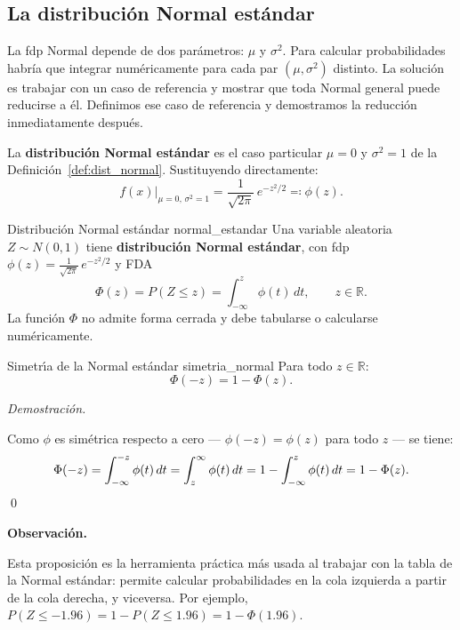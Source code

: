 \documentclass[12pt, a4paper]{book}
\newenvironment{observacion}{%
    \par\medskip\noindent\textbf{\color{azul}Observaci\'{o}n.}\enspace\itshape
}{\par\medskip}
\renewenvironment{proof}{%
    \par\medskip\noindent\textit{Demostraci\'{o}n.}\enspace
}{\qed\par\medskip}
\numberwithin{equation}{chapter}
\begin{document}
\subsection{La distribuci\'{o}n Normal est\'{a}ndar}

La fdp Normal depende de dos parámetros: $\mu$ y $\sigma^2$.
Para calcular probabilidades habría que integrar numéricamente
para cada par $(\mu, \sigma^2)$ distinto. La solución es
trabajar con un caso de referencia y mostrar que toda Normal
general puede reducirse a él. Definimos ese caso de referencia
y demostramos la reducción inmediatamente después.

La \textbf{distribuci\'{o}n Normal est\'{a}ndar} es el caso
particular $\mu = 0$ y $\sigma^2 = 1$ de la
Definici\'{o}n~\ref{def:dist_normal}. Sustituyendo directamente:
\[
f(x)\big|_{\mu=0,\,\sigma^2=1}
= \frac{1}{\sqrt{2\pi}}\,e^{-z^2/2}
\eqqcolon \phi(z).
\]

\begin{definicion}{Distribuci\'{o}n Normal est\'{a}ndar}
	{normal_estandar}
	Una variable aleatoria $Z \sim N(0,1)$ tiene
	\textbf{distribuci\'{o}n Normal est\'{a}ndar}, con fdp
	$\phi(z) = \frac{1}{\sqrt{2\pi}}\,e^{-z^2/2}$ y FDA
	\[
	\Phi(z) = P(Z \leq z) =
	\int_{-\infty}^{z} \phi(t)\,dt,
	\qquad z \in \mathbb{R}.
	\]
	La función $\Phi$ no admite forma cerrada y debe tabularse
	o calcularse numéricamente.
\end{definicion}

\begin{proposicion}{Simetr\'{\i}a de la Normal est\'{a}ndar}
	{simetria_normal}
	Para todo $z \in \mathbb{R}$:
	\[
	\Phi(-z) = 1 - \Phi(z).
	\]
\end{proposicion}

\begin{proof}
	Como $\phi$ es simétrica respecto a cero --- $\phi(-z) =
	\phi(z)$ para todo $z$ --- se tiene:
	\[
	\Phi(-z) = \int_{-\infty}^{-z} \phi(t)\,dt
	= \int_{z}^{\infty} \phi(t)\,dt
	= 1 - \int_{-\infty}^{z} \phi(t)\,dt
	= 1 - \Phi(z). \qedhere
	\]
\end{proof}

\begin{observacion}
	Esta proposición es la herramienta práctica más usada al
	trabajar con la tabla de la Normal estándar: permite calcular
	probabilidades en la cola izquierda a partir de la cola
	derecha, y viceversa. Por ejemplo,
	$P(Z \leq -1.96) = 1 - P(Z \leq 1.96) = 1 - \Phi(1.96)$.
\end{observacion}
\end{document}
